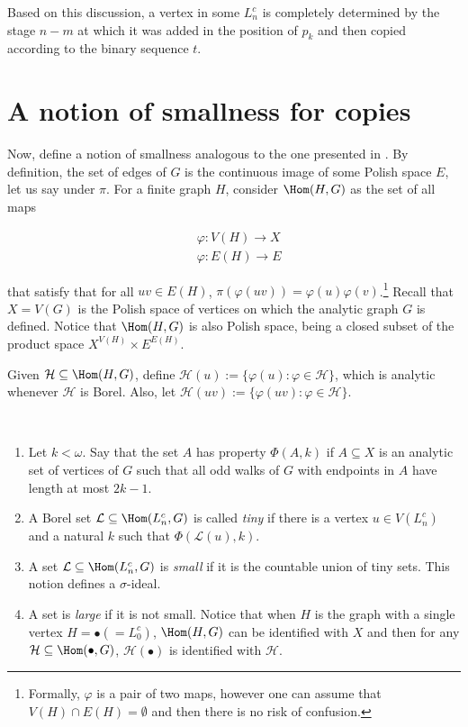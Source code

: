 \documentclass[12pt]{article}
\begin{document}
Based on this discussion, a vertex in some $L^c_n$ is completely determined by the stage $n-m$ at which it was added in the position of $p_k$ and then copied according to the binary sequence $t$.

\section{A notion of smallness for copies}\label{sec:notion-smallness}

Now, define a notion of smallness analogous to the one presented in \cite{Bernshteyn2024}.
By definition, the set of edges of $G$ is the continuous image of some Polish space $E$, let us say under $\pi$.
For a finite graph $H$, consider $\Hom(H,G)$ as the set of all maps

\begin{align*}
    &\varphi\colon V(H)\to X\\
    &\varphi\colon E(H)\to E
\end{align*}

that satisfy that for all $uv\in E(H)$, $\pi(\varphi(uv))=\varphi(u)\varphi(v)$.\footnote{Formally, $\varphi$ is a pair of two maps, however one can assume that $V(H)\cap E(H)=\emptyset$ and then there is no risk of confusion.}
Recall that $X=V(G)$ is the Polish space of vertices on which the analytic graph $G$ is defined.
Notice that $\Hom(H,G)$ is also Polish space, being a closed subset of the product space $X^{V(H)}\times E^{E(H)}$.

Given $\mathcal H\subseteq\Hom(H,G)$, define $\mathcal H(u):=\{\varphi(u):\varphi\in\mathcal H\}$, which is analytic whenever $\mathcal H$ is Borel.
Also, let $\mathcal H(uv):=\{\varphi(uv):\varphi\in\mathcal H\}$.

\begin{definition}\label{def:small}~ 
\begin{enumerate}
    \item Let $k<\omega$.
    Say that the set $A$ has property $\Phi(A,k)$ if $A\subseteq X$ is an analytic set of vertices of $G$ such that all odd walks of $G$ with endpoints in $A$ have length at most $2k-1$.

    \item A Borel set $\mathcal L\subseteq\Hom(L^c_n,G)$ is called \emph{tiny} if there is a vertex $u\in V(L^c_n)$ and a natural $k$ such that $\Phi(\mathcal L(u),k)$.

    \item A set $\mathcal L\subseteq\Hom(L^c_n,G)$ is \emph{small} if it is the countable union of tiny sets.
    This notion defines a $\sigma$-ideal.

    \item A set is \emph{large} if it is not small.
    Notice that when $H$ is the graph with a single vertex $H=\bullet\left(=L^c_0\right)$, $\Hom(H,G)$ can be identified with $X$ and then for any $\mathcal H\subseteq\Hom(\bullet,G)$, $\mathcal H(\bullet)$ is identified with $\mathcal H$.
\end{enumerate}
\end{definition}
\end{document}

